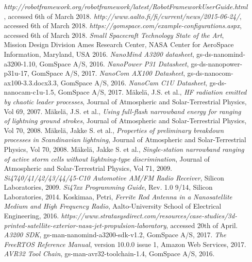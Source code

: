 \documentclass[english,12pt,a4paper,pdftex,elec,utf8]{aaltothesis}
\begin{document}
\begin{thebibliography}{99}
  \textit{http://robotframework.org/robotframework/latest/RobotFrameworkUserGuide.html}, accessed 6th of March 2018.  
  \textit{http://www.aalto.fi/fi/current/news/2015-06-24/}, accessed 6th of March 2018.
  \textit{https://gomspace.com/example-configurations.aspx}, accessed 6th of March 2018.
  \textit{Small Spacecraft Technology State of the Art}, Mission Design Division 
Ames Research Center, NASA Center for AeroSpace Information, Maryland, USA 2016.
  \textit{NanoMind A3200 datasheet}, gs-ds-nanomind-a3200-1.10, GomSpace A/S, 2016.
  \textit{NanoPower P31 Datasheet}, gs-ds-nanopower-p31u-17, GomSpace A/S, 2017.
  \textit{NanoCom AX100 Datasheet}, gs-ds-nanocom-ax100-3.3.docx3.3, GomSpace A/S, 2016.
  \textit{NanoCam C1U Datasheet}, gs-ds-nanocam-c1u-1.5, GomSpace A/S, 2017.
 Mäkelä, J.S. et al.,
  \textit{HF radiation emitted by chaotic leader processes}, Journal of Atmospheric and Solar-Terrestrial Physics, Vol 69, 2007.  
 Mäkelä, J.S. et al.,
  \textit{Using full-flash narrowband energy for ranging of lightning
ground strokes}, Journal of Atmospheric and Solar-Terrestrial Physics, Vol 70, 2008.  
 Mäkelä, Jakke S. et al.,
  \textit{Properties of preliminary breakdown processes in
Scandinavian lightning}, Journal of Atmospheric and Solar-Terrestrial Physics, Vol 70, 2008.
 Mäkelä, Jakke S. et al.,
  \textit{Single-station narrowband ranging of active storm cells without
lightning-type discrimination}, Journal of Atmospheric and Solar-Terrestrial Physics, Vol 71, 2009.
  \textit{Si4740/41/42/43/44/45-C10 Automotive AM/FM Radio
Receiver}, Silicon Laboratories, 2009.
  \textit{Si47xx Programming Guide}, Rev. 1.0 9/14, Silicon Laboratories, 2014.
 Koskimaa, Petri,
  \textit{Ferrite Rod Antenna in a Nanosatellite Medium and High Frequency Radio}, Aalto-University School of Electrical Engineering, 2016.
  \textit{https://www.stratasysdirect.com/resources/case-studies/3d-printed-satellite-exterior-nasa-jet-propulsion-laboratory}, accessed 20th of April.
  \textit{A3200 SDK}, gs-man-nanomind-a3200-sdk-v1.2, GomSpace A/S, 2017.
  \textit{The FreeRTOS Reference Manual}, version 10.0.0 issue 1, Amazon Web Services, 2017.
  \textit{AVR32 Tool Chain}, gs-man-avr32-toolchain-1.4, GomSpace A/S, 2016.

\end{thebibliography}
\end{document}
